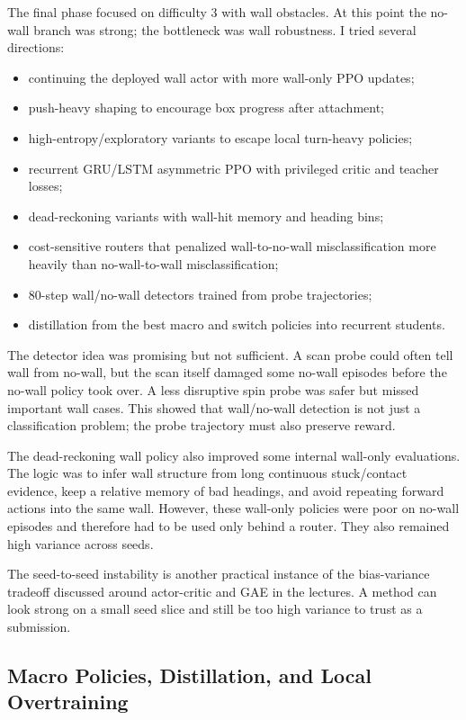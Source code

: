 \documentclass[11pt, oneside]{article}   	%
\begin{document}
The final phase focused on difficulty 3 with wall obstacles. At this point the no-wall
branch was strong; the bottleneck was wall robustness. I tried several directions:
\begin{itemize}[leftmargin=1.5em]
  \item continuing the deployed wall actor with more wall-only PPO updates;
  \item push-heavy shaping to encourage box progress after attachment;
  \item high-entropy/exploratory variants to escape local turn-heavy policies;
  \item recurrent GRU/LSTM asymmetric PPO with privileged critic and teacher losses;
  \item dead-reckoning variants with wall-hit memory and heading bins;
  \item cost-sensitive routers that penalized wall-to-no-wall misclassification more
  heavily than no-wall-to-wall misclassification;
  \item 80-step wall/no-wall detectors trained from probe trajectories;
  \item distillation from the best macro and switch policies into recurrent students.
\end{itemize}

The detector idea was promising but not sufficient. A scan probe could often tell wall
from no-wall, but the scan itself damaged some no-wall episodes before the no-wall
policy took over. A less disruptive spin probe was safer but missed important wall
cases. This showed that wall/no-wall detection is not just a classification problem; the
probe trajectory must also preserve reward.

The dead-reckoning wall policy also improved some internal wall-only evaluations. The
logic was to infer wall structure from long continuous stuck/contact evidence, keep a
relative memory of bad headings, and avoid repeating forward actions into the same
wall. However, these wall-only policies were poor on no-wall episodes and therefore had
to be used only behind a router. They also remained high variance across seeds.

The seed-to-seed instability is another practical instance of the bias-variance tradeoff
discussed around actor-critic and GAE in the lectures. A method can look strong on a
small seed slice and still be too high variance to trust as a submission.

\subsection{Macro Policies, Distillation, and Local Overtraining}
\end{document}
